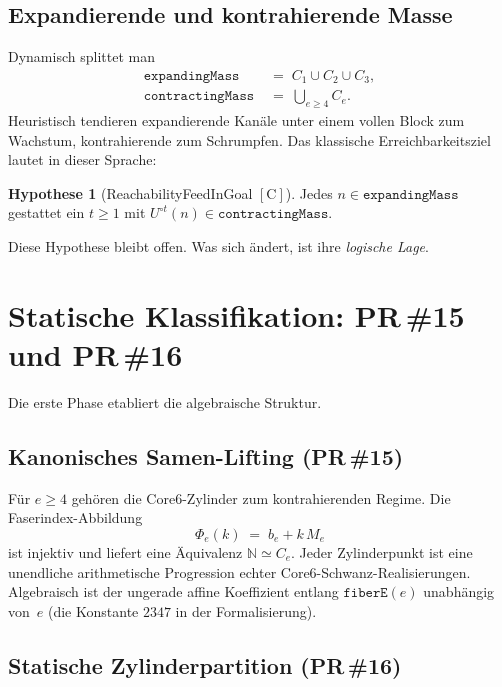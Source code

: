 \documentclass[11pt,a4paper]{article}
\theoremstyle{definition}
\newtheorem{hypothesis}[theorem]{Hypothese}
\theoremstyle{remark}
\newcommand{\tagC}{\ensuremath{[\mathrm{C}]}}
\newcommand{\Umap}{U}
\newcommand{\N}{\mathbb{N}}
\begin{document}
\subsection{Expandierende und kontrahierende Masse}

Dynamisch splittet man
\begin{align*}
  \mathtt{expandingMass}
  &\;=\; C_1\cup C_2\cup C_3,\\
  \mathtt{contractingMass}
  &\;=\; \textstyle\bigcup_{e\ge 4} C_e.
\end{align*}
Heuristisch tendieren expandierende Kanäle unter einem vollen Block zum
Wachstum, kontrahierende zum Schrumpfen. Das klassische Erreichbarkeitsziel
lautet in dieser Sprache:

\begin{hypothesis}[ReachabilityFeedInGoal \tagC]
Jedes $n\in\mathtt{expandingMass}$ gestattet ein $t\ge 1$ mit
$\Umap^{\circ t}(n)\in\mathtt{contractingMass}$.
\end{hypothesis}

Diese Hypothese bleibt offen. Was sich ändert, ist ihre
\emph{logische Lage}.

\section{Statische Klassifikation: PR\,\#15 und PR\,\#16}

Die erste Phase etabliert die algebraische Struktur.

\subsection{Kanonisches Samen-Lifting (PR\,\#15)}

Für $e\ge 4$ gehören die Core6-Zylinder zum kontrahierenden Regime.
Die Faserindex-Abbildung
\[
  \Phi_e(k)
  \;=\;
  b_e + k\, M_e
\]
ist injektiv und liefert eine Äquivalenz $\N\simeq C_e$. Jeder
Zylinderpunkt ist eine unendliche arithmetische Progression echter
Core6-Schwanz-Realisierungen. Algebraisch ist der ungerade affine
Koeffizient entlang $\mathtt{fiberE}(e)$ unabhängig von~$e$ (die Konstante
$2347$ in der Formalisierung).

\subsection{Statische Zylinderpartition (PR\,\#16)}
\end{document}
